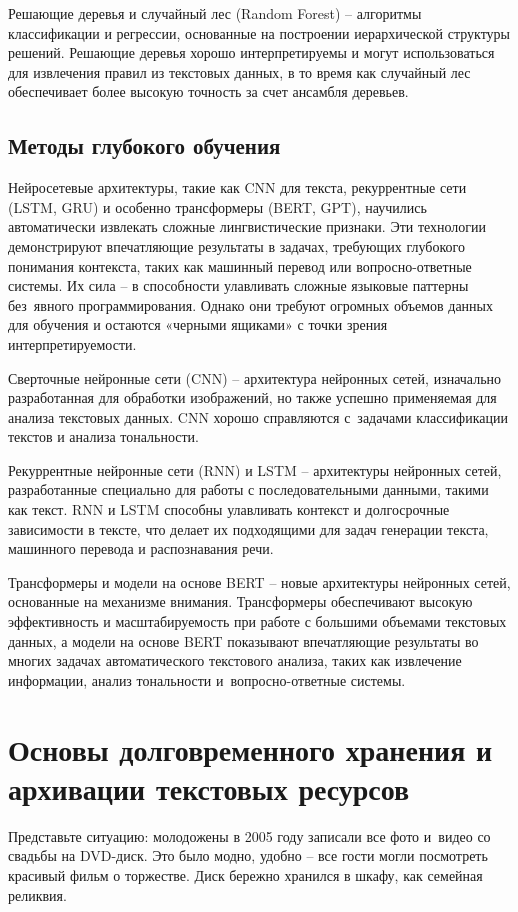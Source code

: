 \documentclass{ou}
\begin{document}
Решающие деревья и случайный лес (Random Forest) -- алгоритмы классификации и регрессии, основанные на построении иерархической структуры решений. Решающие деревья хорошо интерпретируемы и могут использоваться для извлечения правил из текстовых данных, в то время как случайный лес обеспечивает более высокую точность за счет ансамбля деревьев. 
\subsection{Методы глубокого обучения}
Нейросетевые архитектуры, такие как CNN для текста, рекуррентные сети (LSTM, GRU) и особенно трансформеры (BERT, GPT), научились автоматически извлекать сложные лингвистические признаки. Эти технологии демонстрируют впечатляющие результаты в задачах, требующих глубокого понимания контекста, таких как машинный перевод или вопросно-ответные системы. Их сила -- в способности улавливать сложные языковые паттерны без~явного программирования. Однако они требуют огромных объемов данных для обучения и остаются «черными ящиками» с точки зрения интерпретируемости.

Сверточные нейронные сети (CNN) -- архитектура нейронных сетей, изначально разработанная для обработки изображений, но также успешно применяемая для анализа текстовых данных. CNN хорошо справляются с~задачами классификации текстов и анализа тональности. 

Рекуррентные нейронные сети (RNN) и LSTM -- архитектуры нейронных сетей, разработанные специально для работы с последовательными данными, такими как текст. RNN и LSTM способны улавливать контекст и долгосрочные зависимости в тексте, что делает их подходящими для задач генерации текста, машинного перевода и распознавания речи. 

Трансформеры и модели на основе BERT -- новые архитектуры нейронных сетей, основанные на механизме внимания. Трансформеры обеспечивают высокую эффективность и масштабируемость при работе с большими объемами текстовых данных, а модели на основе BERT показывают впечатляющие результаты во многих задачах автоматического текстового анализа, таких как извлечение информации, анализ тональности и~вопросно-ответные системы. 
\newpage
\section{Основы долговременного хранения и архивации текстовых ресурсов}
Представьте ситуацию: молодожены в 2005 году записали все фото и~видео со свадьбы на DVD-диск. Это было модно, удобно -- все гости могли посмотреть красивый фильм о торжестве. Диск бережно хранился в шкафу, как семейная реликвия.
\end{document}
